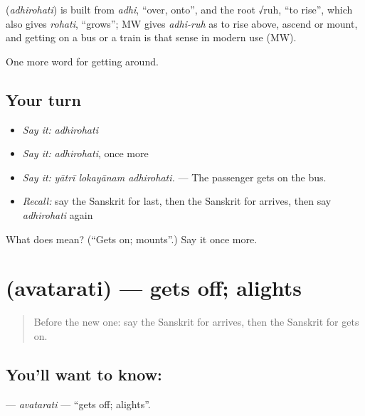 \begin{cousinweb}
\textbf{} (\emph{adhirohati}) is built from \emph{adhi}, \textquotedblleft{}over, onto\textquotedblright{}, and the root √ruh, \textquotedblleft{}to rise\textquotedblright{}, which also gives \emph{rohati}, \textquotedblleft{}grows\textquotedblright{}; MW gives \emph{adhi-ruh} as to rise above, ascend or mount, and getting on a bus or a train is that sense in modern use (MW).
\end{cousinweb}

\begin{grammarlens}[title={What you've built}]
One more word for getting around.
\end{grammarlens}

\subsection*{Your turn}
\begin{itemize}
\raggedright
  \item \emph{Say it:} \emph{adhirohati}
  \item \emph{Say it:} \emph{adhirohati}, once more
  \item \emph{Say it:} \emph{yātrī lokayānam adhirohati.} — The passenger gets on the bus.
  \item \emph{Recall:} say the Sanskrit for last, then the Sanskrit for arrives, then say \emph{adhirohati} again
\end{itemize}

\begin{tcolorbox}[breakable,colback=teal!4,colframe=teal!35!black,title={Before you move on}]
What does  mean? (\textquotedblleft{}Gets on; mounts\textquotedblright{}.) Say it once more.
\end{tcolorbox}
\section[\texorpdfstring{\sk{अवतरति} (avatarati)}{अवतरति (avatarati)}]{ (avatarati) — gets off; alights}

\label{lesson:SA-C406-avatarati}



\begin{quote}
Before the new one: say the Sanskrit for arrives, then the Sanskrit for gets on.
\end{quote}

\subsection*{You'll want to know: }
\textbf{} — \emph{avatarati} — \textquotedblleft{}gets off; alights\textquotedblright{}.

